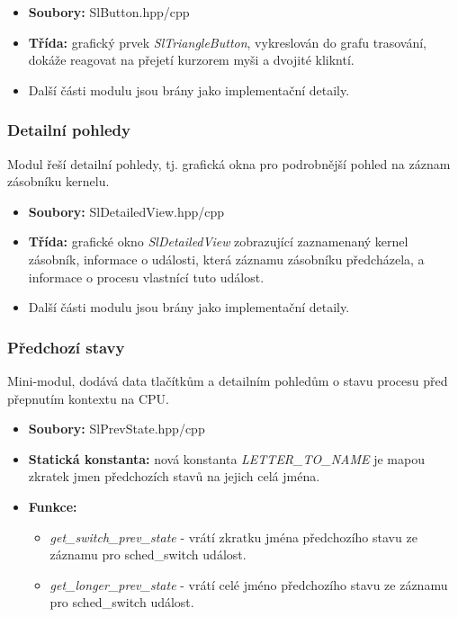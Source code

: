 \begin{itemize}
  \item \textbf{Soubory:} SlButton.hpp/cpp
  \item \textbf{Třída:} grafický prvek \emph{SlTriangleButton}, vykreslován do grafu trasování, dokáže reagovat na přejetí kurzorem myši a dvojité klikntí.
  \item Další části modulu jsou brány jako implementační detaily.
\end{itemize}

\subsubsection*{Detailní pohledy}
Modul řeší detailní pohledy, tj. grafická okna pro podrobnější pohled na záznam zásobníku kernelu.

\begin{itemize}
  \item \textbf{Soubory:} SlDetailedView.hpp/cpp
  \item \textbf{Třída:} grafické okno \emph{SlDetailedView} zobrazující zaznamenaný kernel zásobník, informace o události, která záznamu zásobníku předcházela, a informace o procesu vlastnící tuto událost.
  \item Další části modulu jsou brány jako implementační detaily.
\end{itemize}

\subsubsection*{Předchozí stavy}
Mini-modul, dodává data tlačítkům a detailním pohledům o stavu procesu před přepnutím kontextu na CPU.

\begin{itemize}
  \item \textbf{Soubory:} SlPrevState.hpp/cpp
  \item \textbf{Statická konstanta:} nová konstanta \emph{LETTER\_TO\_NAME} je mapou zkratek jmen předchozích stavů na jejich celá jména.
  \item \textbf{Funkce:} 
  \begin{itemize}
    \item \emph{get\_switch\_prev\_state} - vrátí zkratku jména předchozího stavu ze záznamu pro sched\_switch událost.
    \item \emph{get\_longer\_prev\_state} - vrátí celé jméno předchozího stavu ze záznamu pro sched\_switch událost.
  \end{itemize}
\end{itemize}


